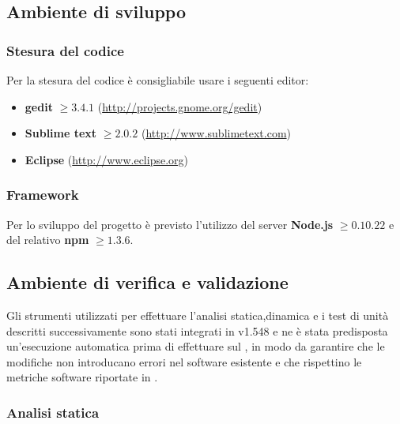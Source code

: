 	\subsection{Ambiente di sviluppo}
		
		\subsubsection{Stesura del codice}
		
		Per la stesura del codice è consigliabile usare i seguenti editor:
		\begin{itemize}
			\item \textbf{gedit} $\geq 3.4.1$ (\url{http://projects.gnome.org/gedit})
			\item \textbf{Sublime text} $\geq 2.0.2$ (\url{http://www.sublimetext.com})
			\item \textbf{Eclipse} (\url{http://www.eclipse.org})
		\end{itemize}
		
		\subsubsection{Framework}
		
		Per lo sviluppo del progetto è previsto l'utilizzo del server \textbf{Node.js} $\geq 0.10.22$ e del relativo  \textbf{npm} $\geq 1.3.6$.

	\subsection{Ambiente di verifica e validazione}
	Gli strumenti utilizzati per effettuare l'analisi statica,dinamica e i test di unità descritti successivamente sono stati
	integrati in  v1.548 e ne è stata predisposta un'esecuzione automatica prima di effettuare 
	sul , in modo da garantire che le modifiche non introducano errori nel software esistente e che rispettino
	le metriche software riportate in \PianoDiQualifica{}.

		\subsubsection{Analisi statica}
		
